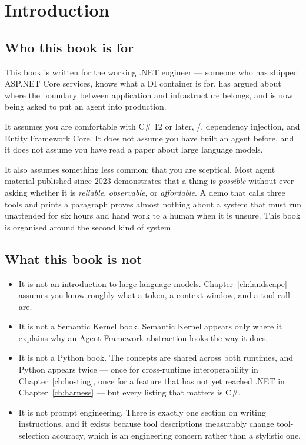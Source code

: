 \chapter*{Introduction}

\section*{Who this book is for}

This book is written for the working .NET engineer --- someone who has shipped
ASP.NET Core services, knows what a DI container is for, has argued about
where the boundary between application and infrastructure belongs, and is now
being asked to put an agent into production.

It assumes you are comfortable with C\# 12 or later, /,
dependency injection, and Entity Framework Core. It does not assume you have
built an agent before, and it does not assume you have read a paper about
large language models.

It also assumes something less common: that you are sceptical. Most agent
material published since 2023 demonstrates that a thing is \emph{possible}
without ever asking whether it is \emph{reliable}, \emph{observable}, or
\emph{affordable}. A demo that calls three tools and prints a paragraph proves
almost nothing about a system that must run unattended for six hours and hand
work to a human when it is unsure. This book is organised around the second
kind of system.

\section*{What this book is not}

\begin{itemize}[leftmargin=1.4em]
  \item It is not an introduction to large language models. Chapter~\ref{ch:landscape}
        assumes you know roughly what a token, a context window, and a tool call are.
  \item It is not a Semantic Kernel book. Semantic Kernel appears only where it
        explains why an Agent Framework abstraction looks the way it does.
  \item It is not a Python book. The concepts are shared across both runtimes,
        and Python appears twice --- once for cross-runtime interoperability in
        Chapter~\ref{ch:hosting}, once for a feature that has not yet reached .NET
        in Chapter~\ref{ch:harness} --- but every listing that matters is C\#.
  \item It is not prompt engineering. There is exactly one section on writing
        instructions, and it exists because tool descriptions measurably change
        tool-selection accuracy, which is an engineering concern rather than a
        stylistic one.
\end{itemize}

